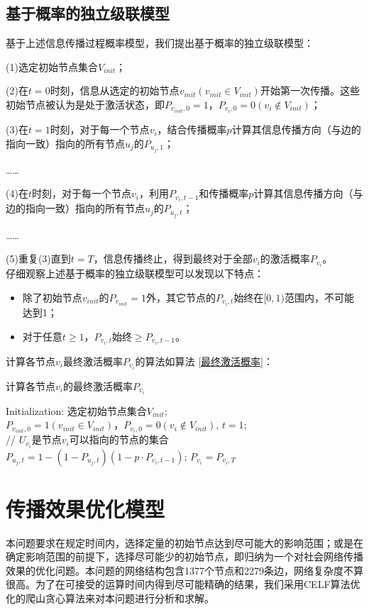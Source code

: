 \documentclass[UTF8]{ctexart}
\begin{document}
\subsection{基于概率的独立级联模型}
基于上述信息传播过程概率模型，我们提出基于概率的独立级联模型：

(1)选定初始节点集合$V_{init}$；

(2)在$t=0$时刻，信息从选定的初始节点$v_{init}(v_{init}\in V_{init})$开始第一次传播。这些初始节点被认为是处于激活状态，即$P_{v_{init},0}=1$，$P_{v_i,0}=0(v_i\notin V_{init})$；

(3)在$t=1$时刻，对于每一个节点$v_i$，结合传播概率$p$计算其信息传播方向（与边的指向一致）指向的所有节点$u_j$的$P_{u_j,1}$；

\ldots \ldots

(4)在$t$时刻，对于每一个节点$v_i$，利用$P_{v_i,t-1}$和传播概率$p$计算其信息传播方向（与边的指向一致）指向的所有节点$u_j$的$P_{u_j,t}$；

\ldots \ldots

(5)重复(3)直到$t=T$，信息传播终止，得到最终对于全部$v_i$的激活概率$P_{v_i}$。
~\\

仔细观察上述基于概率的独立级联模型可以发现以下特点：
\begin{itemize}
	\item 除了初始节点$v_{init}$的$P_{v_{init}}=1$外，其它节点的$P_{v_{i},t}$始终在$[0,1)$范围内，不可能达到1；
	\item 对于任意$t\geqslant 1$，$P_{v_{i},t}$始终$\geqslant P_{v_{i},t-1}$。
\end{itemize}

计算各节点$v_{i}$最终激活概率$P_{v_{i}}$的算法如算法 \ref{最终激活概率}：
\begin{algorithm}[h!]
	\caption{计算各节点$v_{i}$的最终激活概率$P_{v_{i}}$}
	\label{最终激活概率}	
	Initialization: 选定初始节点集合$V_{init}$;\\
	$P_{v_{init},0}=1(v_{init}\in V_{init})$，$P_{v_i,0}=0(v_i\notin V_{init})$,	$t=1$;\\
	{
		{
		  {
		  	// $U_{v_i}$是节点$v_i$可以指向的节点的集合\\
		  	$P_{u_j,t}=1-(1-P_{u_j,t})(1-p \cdot P_{v_i,t-1})$;
		  }
		}
	}
	{
		$P_{v_i}=P_{v_i,T}$
	}
\end{algorithm}




\section{传播效果优化模型}
本问题要求在规定时间内，选择定量的初始节点达到尽可能大的影响范围；或是在确定影响范围的前提下，选择尽可能少的初始节点，即归纳为一个对社会网络传播效果的优化问题。本问题的网络结构包含1377个节点和2279条边，网络复杂度不算很高。为了在可接受的运算时间内得到尽可能精确的结果，我们采用CELF算法优化的爬山贪心算法来对本问题进行分析和求解。
\end{document}
